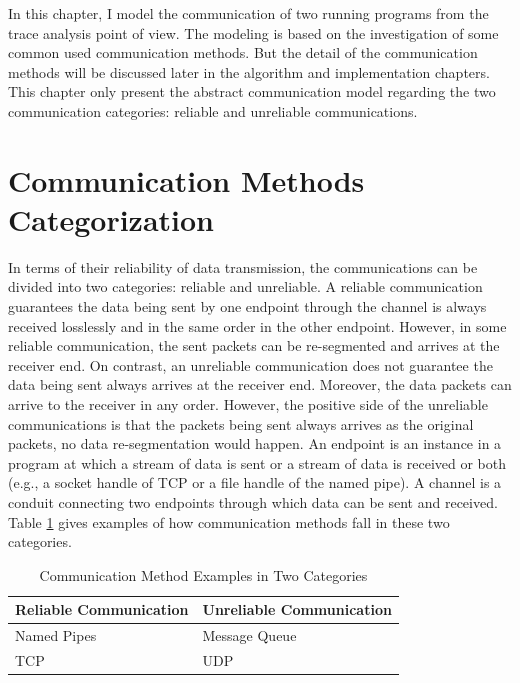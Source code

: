 
\label{chapter:mod}
In this chapter, I model the communication of two running programs from the trace analysis point of view. The modeling is based on the investigation of some common used communication methods. But the detail of the communication methods will be discussed later in the algorithm and implementation chapters. This chapter only present the abstract communication model regarding the two communication categories: reliable and unreliable communications. 

\section{Communication Methods Categorization}
In terms of their reliability of data transmission, the communications can be divided into two categories: reliable and unreliable. A reliable communication guarantees the data being sent by one endpoint through the channel is always received losslessly and in the same order in the other endpoint. However, in some reliable communication, the sent packets can be re-segmented and arrives at the receiver end. On contrast, an unreliable communication does not guarantee the data being sent always arrives at the receiver end. Moreover, the data packets can arrive to the receiver in any order. However, the positive side of the unreliable communications is that the packets being sent always arrives as the original packets, no data re-segmentation would happen. An endpoint is an instance in a program at which a stream of data is sent or a stream of data is received or both (e.g., a socket handle of TCP or a file handle of the named pipe). A channel is a conduit connecting two endpoints through which data can be sent and received. Table \ref{methodsInCategories} gives examples of how communication methods fall in these two categories.
\begin{table}[H]
\centering
\caption{Communication Method Examples in Two Categories}
\label{methodsInCategories}
\begin{tabular}{|l|l|}
 \hline
\textbf{Reliable Communication}& \textbf{Unreliable Communication}\\
 \hline
Named Pipes & Message Queue   \\
TCP &  UDP \\
 \hline
\end{tabular}
\end{table}


